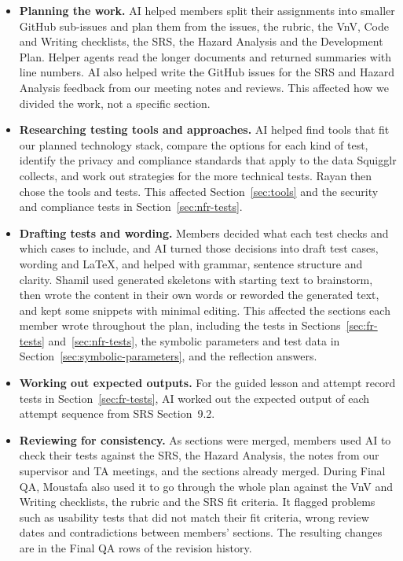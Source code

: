 \documentclass[12pt, titlepage]{article}
\begin{document}
\begin{itemize}
  \item \textbf{Planning the work.} AI helped members split their assignments
  into smaller GitHub sub-issues and plan them from the issues, the rubric, the
  VnV, Code and Writing checklists, the SRS, the Hazard Analysis and the
  Development Plan. Helper agents read the longer documents and returned
  summaries with line numbers. AI also helped write the GitHub issues for the
  SRS and Hazard Analysis feedback from our meeting notes and reviews. This
  affected how we divided the work, not a specific section.

  \item \textbf{Researching testing tools and approaches.} AI helped find tools
  that fit our planned technology stack, compare the options for each kind of
  test, identify the privacy and compliance standards that apply to the data
  Squigglr collects, and work out strategies for the more technical tests.
  Rayan then chose the tools and tests. This affected Section~\ref{sec:tools} and the
  security and compliance tests in Section~\ref{sec:nfr-tests}.

  \item \textbf{Drafting tests and wording.} Members decided what each test
  checks and which cases to include, and AI turned those decisions into draft
  test cases, wording and \LaTeX{}, and helped with grammar, sentence structure
  and clarity. Shamil used generated skeletons with starting text to brainstorm,
  then wrote the content in their own words or reworded the generated text, and
  kept some snippets with minimal editing. This affected the sections each
  member wrote throughout the plan, including the tests in Sections~\ref{sec:fr-tests} and~\ref{sec:nfr-tests},
  the symbolic parameters and test data in Section~\ref{sec:symbolic-parameters}, and the reflection
  answers.

  \item \textbf{Working out expected outputs.} For the guided lesson and attempt
  record tests in Section~\ref{sec:fr-tests}, AI worked out the expected output of each attempt
  sequence from SRS Section~9.2.

  \item \textbf{Reviewing for consistency.} As sections were merged, members
  used AI to check their tests against the SRS, the Hazard Analysis, the notes
  from our supervisor and TA meetings, and the sections already merged. During
  Final QA, Moustafa also used it to go through the whole plan against the VnV
  and Writing checklists, the rubric and the SRS fit criteria. It flagged
  problems such as usability tests that did not match their fit criteria, wrong
  review dates and contradictions between members' sections. The resulting changes are in the Final QA rows of the
  revision history.


\end{itemize}
\end{document}

